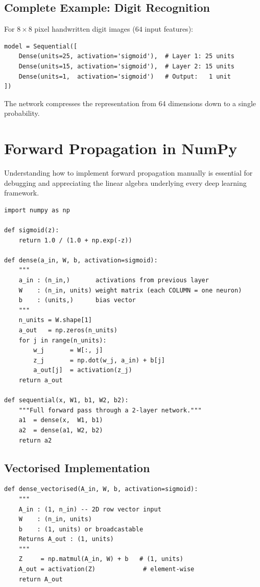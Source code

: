 \subsection{Complete Example: Digit Recognition}

For $8\times 8$ pixel handwritten digit images ($64$ input features):
\begin{lstlisting}[caption={Neural network for handwritten digit recognition}]
model = Sequential([
    Dense(units=25, activation='sigmoid'),  # Layer 1: 25 units
    Dense(units=15, activation='sigmoid'),  # Layer 2: 15 units
    Dense(units=1,  activation='sigmoid')   # Output:   1 unit
])
\end{lstlisting}
The network compresses the representation from 64 dimensions down to a single
probability.

\section{Forward Propagation in NumPy}

Understanding how to implement forward propagation manually is essential for
debugging and appreciating the linear algebra underlying every deep learning
framework.

\begin{lstlisting}[caption={Reusable \texttt{dense()} layer function}]
import numpy as np

def sigmoid(z):
    return 1.0 / (1.0 + np.exp(-z))

def dense(a_in, W, b, activation=sigmoid):
    """
    a_in : (n_in,)       activations from previous layer
    W    : (n_in, units) weight matrix (each COLUMN = one neuron)
    b    : (units,)      bias vector
    """
    n_units = W.shape[1]
    a_out   = np.zeros(n_units)
    for j in range(n_units):
        w_j       = W[:, j]
        z_j       = np.dot(w_j, a_in) + b[j]
        a_out[j]  = activation(z_j)
    return a_out

def sequential(x, W1, b1, W2, b2):
    """Full forward pass through a 2-layer network."""
    a1  = dense(x,  W1, b1)
    a2  = dense(a1, W2, b2)
    return a2
\end{lstlisting}

\subsection{Vectorised Implementation}

\begin{lstlisting}[caption={Vectorised dense layer using \texttt{np.matmul}}]
def dense_vectorised(A_in, W, b, activation=sigmoid):
    """
    A_in : (1, n_in) -- 2D row vector input
    W    : (n_in, units)
    b    : (1, units) or broadcastable
    Returns A_out : (1, units)
    """
    Z     = np.matmul(A_in, W) + b   # (1, units)
    A_out = activation(Z)             # element-wise
    return A_out
\end{lstlisting}

